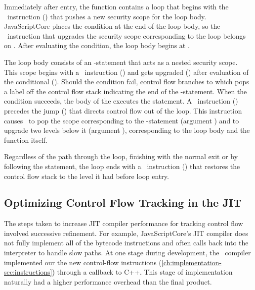 Immediately after entry, the  function contains a loop that begins with the \dup\ instruction () that pushes a new security scope for the loop body.
JavaScriptCore places the condition at the end of the loop body, so the \join\ instruction that upgrades the security scope corresponding to the loop belongs on .
After evaluating the condition, the loop body begins at .

The loop body consists of an -statement that acts as a nested security scope.
This scope begins with a \dup\ instruction () and gets upgraded () after evaluation of the conditional ().
Should the condition fail, control flow branches to  which pops a label off the control flow stack indicating the end of the -statement.
When the condition succeeds, the body of the  executes the  statement.
A \popj\ instruction () precedes the jump () that directs control flow out of the loop.
This instruction causes \JitFlow\ to pop the scope corresponding to the -statement (argument ) and to upgrade two levels below it (argument ), corresponding to the loop body and the function itself.

Regardless of the path through the loop, finishing with the normal exit or by following the  statement, the loop ends with a \popj\ instruction () that restores the control flow stack to the level it had before loop entry.

\subsection{Optimizing Control Flow Tracking in the JIT}\label{ch:implementation-sec:jitflow-optimizations}

The steps taken to increase JIT compiler performance for tracking control flow involved successive refinement.
For example, JavaScriptCore's JIT compiler does not fully implement all of the bytecode instructions and often calls back into the interpreter to handle slow paths.
At one stage during development, the \JitFlow\ compiler implemented our the new control-flow instructions (\autoref{ch:implementation-sec:instructions}) through a callback to C++.
This stage of implementation naturally had a higher performance overhead than the final product.

